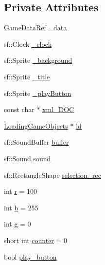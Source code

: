 \subsection*{Private Attributes}
\begin{DoxyCompactItemize}
\item 
\hyperlink{namespaceSekander_a1d69b002ba2d23020901c28f0def5e16}{Game\+Data\+Ref} \hyperlink{classSekander_1_1MainMenuState_a531c88f2e6cc0645a0884a838c821ebc}{\+\_\+data}
\item 
sf\+::\+Clock \hyperlink{classSekander_1_1MainMenuState_a6a325d1ce58ad153f8647cf415968e50}{\+\_\+clock}
\item 
sf\+::\+Sprite \hyperlink{classSekander_1_1MainMenuState_a4397a65b30ddc70f19fb7cb5eef95b40}{\+\_\+background}
\item 
sf\+::\+Sprite \hyperlink{classSekander_1_1MainMenuState_ab8a4eec1c1100bed373e648a0659d26c}{\+\_\+title}
\item 
sf\+::\+Sprite \hyperlink{classSekander_1_1MainMenuState_a0283163c03392b1f056e682885822568}{\+\_\+play\+Button}
\item 
const char $\ast$ \hyperlink{classSekander_1_1MainMenuState_ab1dafb7e7d50beb5418e72334f81dabd}{xml\+\_\+\+D\+OC}
\item 
\hyperlink{classSekander_1_1LoadingGameObjects}{Loading\+Game\+Objects} $\ast$ \hyperlink{classSekander_1_1MainMenuState_ac0847b104c1fcbfcf19c9216b453d34c}{ld}
\item 
sf\+::\+Sound\+Buffer \hyperlink{classSekander_1_1MainMenuState_a9e445190379faaf2b2f7f8a97f55204d}{buffer}
\item 
sf\+::\+Sound \hyperlink{classSekander_1_1MainMenuState_af764062a7f43fc388d4e687ab3dca3e5}{sound}
\item 
sf\+::\+Rectangle\+Shape \hyperlink{classSekander_1_1MainMenuState_afa67fe296f512954d3c571e2c238ebd0}{selection\+\_\+rec}
\item 
int \hyperlink{classSekander_1_1MainMenuState_aca590f1c1e91223e5f783a93592f165c}{r} = 100
\item 
int \hyperlink{classSekander_1_1MainMenuState_a8e13c8df7da479728bef75e72cf4fb29}{b} = 255
\item 
int \hyperlink{classSekander_1_1MainMenuState_a8ee331bec9e89dcc67d231cf1c04bd83}{g} = 0
\item 
short int \hyperlink{classSekander_1_1MainMenuState_a8f65f83c7db9e9daae0aa0895f462367}{counter} = 0
\item 
bool \hyperlink{classSekander_1_1MainMenuState_a1a25539301721a9ee12f71309d5a62f1}{play\+\_\+button}

\end{DoxyCompactItemize}
